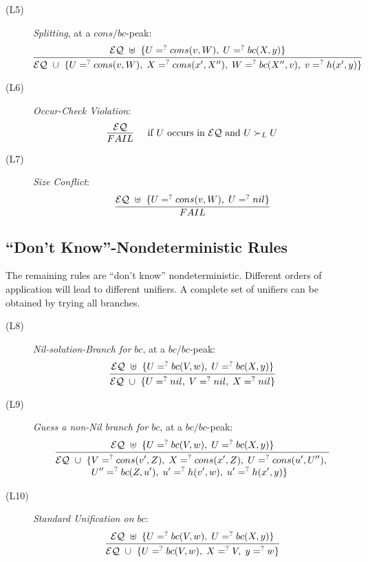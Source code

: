 \documentclass[11pt]{article}
\newcommand{\ueq}{=_{}^?}
\newcommand{\EQ}{\mathcal{EQ}}
\begin{document}
\begin{description}
    \item[(L5)] {\em Splitting}, at a $cons/bc$-peak:
        \[\infer
            {\EQ ~ \cup ~ \{ U \ueq cons(v, W) , \; X \ueq cons(x', X''), \;
                             W \ueq bc(X'', v), \; v \ueq h(x', y) \}}
            {\EQ ~ \uplus ~ \{ U \ueq cons(v, W), \;
                               U \ueq bc(X, y) \}}
        \]

    \item[(L6)] {\em Occur-Check Violation}:
        \[\infer[\quad \text{if } U \text{ occurs in } \EQ
                 \text{ and }  U \succ_L U]
            { FAIL }
            { \EQ }
        \]

    \item[(L7)] {\em Size Conflict}:
        \[\infer
            { FAIL }
            { \EQ ~ \uplus ~ \{ U \ueq cons(v, W), \; U \ueq nil \} }
        \]
\end{description}

\subsection{\texorpdfstring{``Don't Know''}{"Don't Know"}-Nondeterministic Rules}

The remaining rules are ``don't know'' nondeterministic. Different orders of
application will lead to different unifiers. A complete set of unifiers can
be obtained by trying all branches.
\begin{description}
    \item[(L8)] {\em Nil-solution-Branch for $bc$\/}, at a $bc/bc$-peak:
        \[\infer
            {\EQ ~ \cup ~ \{ U \ueq nil, \; V \ueq nil, \; X \ueq nil \}}
            {\EQ ~ \uplus ~ \{ U \ueq bc(V, w), \; U \ueq bc(X, y) \}}
        \]

    \item[(L9)] {\em Guess a non-Nil branch for $bc$\/}, at a $bc/bc$-peak:
        \[\infer
            {\begin{aligned}
                \EQ ~ \cup ~ \{
                & V \ueq cons(v', Z), \; X \ueq cons(x', Z), \;
                  U \ueq cons(u', U''), \; \\[-4pt]
                & U'' \ueq bc(Z, u'), \; u' \ueq h(v', w), \; u' \ueq h(x', y) \}
            \end{aligned}}
            {\EQ ~ \uplus ~ \{ U \ueq bc(V, w), \; U \ueq bc(X, y) \}}
        \]

    \item[(L10)] {\em Standard Unification on $bc$}:
        \[\infer
            {\EQ ~ \cup ~ \{ U \ueq bc(V, w), \; X \ueq V, \; y \ueq w \}}
            {\EQ ~ \uplus ~ \{ U \ueq bc(V, w), \; U \ueq bc(X, y) \}}
        \]
\end{description}
\end{document}
